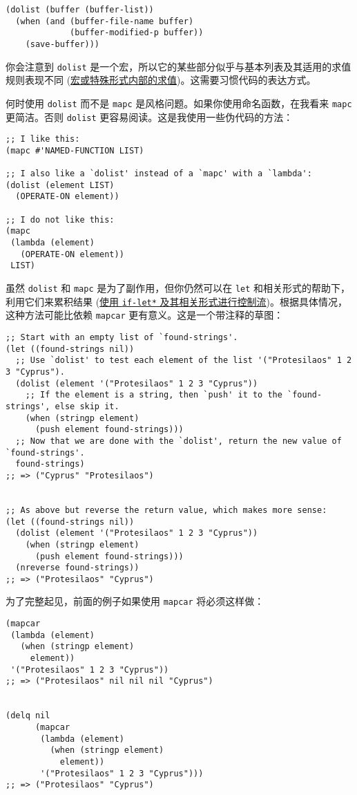 \documentclass[11pt]{ctexart}
\begin{document}
\begin{verbatim}
(dolist (buffer (buffer-list))
  (when (and (buffer-file-name buffer)
             (buffer-modified-p buffer))
    (save-buffer)))
\end{verbatim}

你会注意到 \texttt{dolist} 是一个宏，所以它的某些部分似乎与基本列表及其适用的求值规则表现不同 (\hyperref[sec:org6bfc8f0]{宏或特殊形式内部的求值})。这需要习惯代码的表达方式。

何时使用 \texttt{dolist} 而不是 \texttt{mapc} 是风格问题。如果你使用命名函数，在我看来 \texttt{mapc} 更简洁。否则 \texttt{dolist} 更容易阅读。这是我使用一些伪代码的方法：

\begin{verbatim}
;; I like this:
(mapc #'NAMED-FUNCTION LIST)

;; I also like a `dolist' instead of a `mapc' with a `lambda':
(dolist (element LIST)
  (OPERATE-ON element))

;; I do not like this:
(mapc
 (lambda (element)
   (OPERATE-ON element))
 LIST)
\end{verbatim}

虽然 \texttt{dolist} 和 \texttt{mapc} 是为了副作用，但你仍然可以在 \texttt{let} 和相关形式的帮助下，利用它们来累积结果 (\hyperref[sec:org795b8c4]{使用 \texttt{if-let*} 及其相关形式进行控制流})。根据具体情况，这种方法可能比依赖 \texttt{mapcar} 更有意义。这是一个带注释的草图：

\begin{verbatim}
;; Start with an empty list of `found-strings'.
(let ((found-strings nil))
  ;; Use `dolist' to test each element of the list '("Protesilaos" 1 2 3 "Cyprus").
  (dolist (element '("Protesilaos" 1 2 3 "Cyprus"))
    ;; If the element is a string, then `push' it to the `found-strings', else skip it.
    (when (stringp element)
      (push element found-strings)))
  ;; Now that we are done with the `dolist', return the new value of `found-strings'.
  found-strings)
;; => ("Cyprus" "Protesilaos")


;; As above but reverse the return value, which makes more sense:
(let ((found-strings nil))
  (dolist (element '("Protesilaos" 1 2 3 "Cyprus"))
    (when (stringp element)
      (push element found-strings)))
  (nreverse found-strings))
;; => ("Protesilaos" "Cyprus")
\end{verbatim}

为了完整起见，前面的例子如果使用 \texttt{mapcar} 将必须这样做：

\begin{verbatim}
(mapcar
 (lambda (element)
   (when (stringp element)
     element))
 '("Protesilaos" 1 2 3 "Cyprus"))
;; => ("Protesilaos" nil nil nil "Cyprus")


(delq nil
      (mapcar
       (lambda (element)
         (when (stringp element)
           element))
       '("Protesilaos" 1 2 3 "Cyprus")))
;; => ("Protesilaos" "Cyprus")
\end{verbatim}
\end{document}
